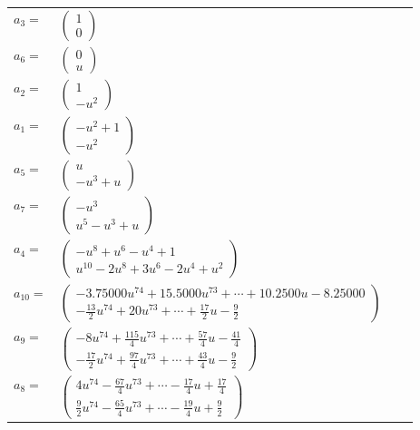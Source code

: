 \documentclass[1p]{elsarticle_modified}
\theoremstyle{definition}
\begin{document}
\begin{tabular}{m{7pt} m{180pt} m{7pt} m{180pt} }
\flushright $a_{3}=$&$\begin{pmatrix}1\\0\end{pmatrix}$ \\
\flushright $a_{6}=$&$\begin{pmatrix}0\\u\end{pmatrix}$ \\
\flushright $a_{2}=$&$\begin{pmatrix}1\\- u^2\end{pmatrix}$ \\
\flushright $a_{1}=$&$\begin{pmatrix}- u^2+1\\- u^2\end{pmatrix}$ \\
\flushright $a_{5}=$&$\begin{pmatrix}u\\- u^3+u\end{pmatrix}$ \\
\flushright $a_{7}=$&$\begin{pmatrix}- u^3\\u^5- u^3+u\end{pmatrix}$ \\
\flushright $a_{4}=$&$\begin{pmatrix}- u^8+u^6- u^4+1\\u^{10}-2 u^8+3 u^6-2 u^4+u^2\end{pmatrix}$ \\
\flushright $a_{10}=$&$\begin{pmatrix}-3.75000 u^{74}+15.5000 u^{73}+\cdots+10.2500 u-8.25000\\-\frac{13}{2} u^{74}+20 u^{73}+\cdots+\frac{17}{2} u-\frac{9}{2}\end{pmatrix}$ \\
\flushright $a_{9}=$&$\begin{pmatrix}-8 u^{74}+\frac{115}{4} u^{73}+\cdots+\frac{57}{4} u-\frac{41}{4}\\-\frac{17}{2} u^{74}+\frac{97}{4} u^{73}+\cdots+\frac{43}{4} u-\frac{9}{2}\end{pmatrix}$ \\
\flushright $a_{8}=$&$\begin{pmatrix}4 u^{74}-\frac{67}{4} u^{73}+\cdots-\frac{17}{4} u+\frac{17}{4}\\\frac{9}{2} u^{74}-\frac{65}{4} u^{73}+\cdots-\frac{19}{4} u+\frac{9}{2}\end{pmatrix}$ \\

\end{tabular}
\end{document}
